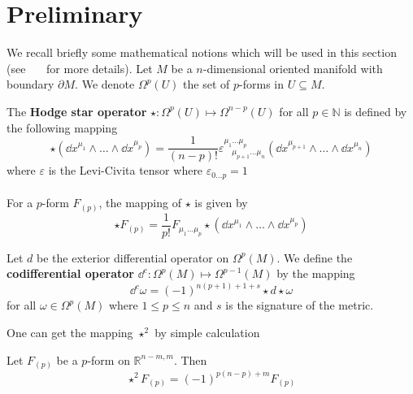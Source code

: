 \section{Preliminary}
We recall briefly some mathematical notions which will be used in this section (see~\cite{Zeidler1995}~\cite{Ivancevic2011}~\cite{Frankel1997} for more details).
Let $M$ be a $n$-dimensional oriented manifold with boundary $\partial M$.
We denote $\Omega^p(U)$ the set of $p$-forms in $U\subseteq M$. 
\begin{definition}
The \textbf{Hodge star operator} $\star : \Omega^p(U) \mapsto \Omega^{n- p}(U)$ for all $p\in\mathbb{N}$ is defined by the following mapping
\begin{equation*}
\star ( \dd x^{\mu_1}\wedge\ldots\wedge\dd x^{\mu_p}) = 
\frac{1}{(n-p)!}\varepsilon^{\mu_1\ldots\mu_p}_{\quad\mu_{p+1}\ldots\mu_n}(\dd x^{\mu_{p+1}}\wedge\ldots\wedge\dd x^{\mu_n})
\end{equation*}
where $\varepsilon$ is the Levi-Civita tensor where $\varepsilon_{0\ldots p} = 1$ \\\\
For a $p$-form $F_{(p)}$, the mapping of $\star$ is given by
\begin{equation*}
\star F_{(p)} = \frac 1 {p !} F_{\mu_1\ldots\mu_p} \star(\dd x^{\mu_1}\wedge\ldots\wedge \dd x^{\mu_p})
\end{equation*}
\end{definition}
%
\begin{definition}
Let $d$ be the exterior differential operator on $\Omega^p(M)$. We define the \textbf{codifferential operator} $\dd^c: \Omega^p(M) \mapsto \Omega^{p-1}(M)$ by the mapping
\begin{equation*}
\dd^c \omega = (-1)^{n(p+1)+1 + s}\star d \star \omega
\end{equation*}
for all $\omega\in\Omega^p(M)$ where $1 \leq p \leq n$ and $s $ is the signature of the metric. 
\end{definition}
%
One can get the mapping $\star^2$ by simple calculation
\begin{proposition}
Let $F_{(p)}$ be a $p$-form on $\mathbb{R}^{n-m, m}$. Then
\begin{equation*}
\star^2 F_{(p)} = (-1)^{p(n-p)+m}F_{(p)}
\end{equation*}
\end{proposition}
